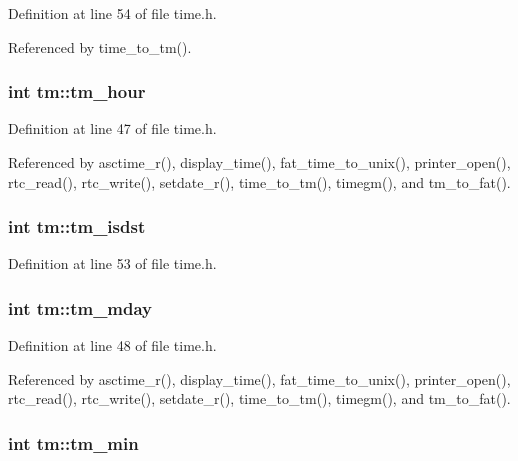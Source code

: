 Definition at line 54 of file time.\-h.



Referenced by time\-\_\-to\-\_\-tm().

\hypertarget{structtm_a3e7ca4e37f1abcaf56b8a916c38eb9fe}{
\subsubsection[{tm\-\_\-hour}]{\setlength{\rightskip}{0pt plus 5cm}int tm\-::tm\-\_\-hour}}\label{structtm_a3e7ca4e37f1abcaf56b8a916c38eb9fe}


Definition at line 47 of file time.\-h.



Referenced by asctime\-\_\-r(), display\-\_\-time(), fat\-\_\-time\-\_\-to\-\_\-unix(), printer\-\_\-open(), rtc\-\_\-read(), rtc\-\_\-write(), setdate\-\_\-r(), time\-\_\-to\-\_\-tm(), timegm(), and tm\-\_\-to\-\_\-fat().

\hypertarget{structtm_a5645ca0580c8ab2c24f6c2965d9c9f9c}{
\subsubsection[{tm\-\_\-isdst}]{\setlength{\rightskip}{0pt plus 5cm}int tm\-::tm\-\_\-isdst}}\label{structtm_a5645ca0580c8ab2c24f6c2965d9c9f9c}


Definition at line 53 of file time.\-h.

\hypertarget{structtm_ab8d8904bad43b0c8b96e61941c5b5310}{
\subsubsection[{tm\-\_\-mday}]{\setlength{\rightskip}{0pt plus 5cm}int tm\-::tm\-\_\-mday}}\label{structtm_ab8d8904bad43b0c8b96e61941c5b5310}


Definition at line 48 of file time.\-h.



Referenced by asctime\-\_\-r(), display\-\_\-time(), fat\-\_\-time\-\_\-to\-\_\-unix(), printer\-\_\-open(), rtc\-\_\-read(), rtc\-\_\-write(), setdate\-\_\-r(), time\-\_\-to\-\_\-tm(), timegm(), and tm\-\_\-to\-\_\-fat().

\hypertarget{structtm_af414eb7c86cc3099595211eee4d4211b}{
\subsubsection[{tm\-\_\-min}]{\setlength{\rightskip}{0pt plus 5cm}int tm\-::tm\-\_\-min}}\label{structtm_af414eb7c86cc3099595211eee4d4211b}


